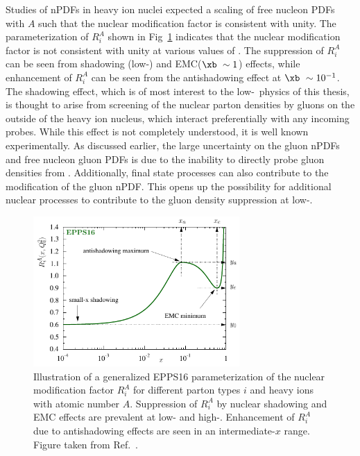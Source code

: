 Studies of nPDFs in heavy ion nuclei expected a scaling of free nucleon PDFs with $A$ such that the nuclear modification factor is consistent with unity. The parameterization of $R_{i}^{A}$ shown in Fig~\ref{fig:shadowing} indicates that the nuclear modification factor is not consistent with unity at various values of \xb. The suppression of $R^{A}_{i}$ can be seen from shadowing (low-\xb) and EMC($\xb~\sim 1$) effects, while enhancement of $R^{A}_{i}$ can be seen from the antishadowing effect at $\xb~\sim 10^{-1}$. The shadowing effect, which is of most interest to the low-\xb\ physics of this thesis, is thought to arise from screening of the nuclear parton densities by gluons on the outside of the heavy ion nucleus, which interact preferentially with any incoming probes. While this effect is not completely understood, it is well known experimentally. As discussed earlier, the large uncertainty on the gluon nPDFs and free nucleon gluon PDFs is due to the inability to directly probe gluon densities from \ftwo. Additionally, final state processes can also contribute to the modification of the gluon nPDF. This opens up the possibility for additional nuclear processes to contribute to the gluon density suppression at low-\xb.

\begin{figure}
	\centering
	\includegraphics[width=0.7\textwidth]{figures/shadowing.pdf} 
	\caption{ Illustration of a generalized EPPS16 parameterization of the nuclear modification factor $R^{A}_{i}$ for different parton types $i$ and heavy ions with atomic number $A$. Suppression of $R^{A}_{i}$ by nuclear shadowing and EMC effects are prevalent at low- and high-\xb. Enhancement of $R^{A}_{i}$ due to antishadowing effects are seen in an intermediate-$x$ range. Figure taken from Ref.~\cite{Eskola:2016oht}. }	
	\label{fig:shadowing}
\end{figure}

